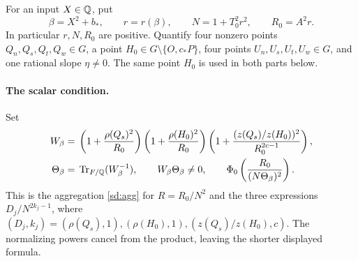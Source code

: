 For an input $X\in\mathbb Q$, put
\[
 \beta=X^2+b_*,\qquad r=r(\beta),\qquad N=1+T_0^2r^2,
 \qquad R_0=A^2r.
\]
In particular $r,N,R_0$ are positive. Quantify four nonzero points
$Q_n,Q_s,Q_t,Q_w\in G$, a point $H_0\in G\setminus\{O,c_*P\}$,
four points $U_n,U_s,U_t,U_w\in G$, and one rational slope $\eta\ne0$.
The same point $H_0$ is used in both parts below.

\paragraph{The scalar condition.}
Set
\begin{equation}\label{sd:scalar}
 \begin{split}
 W_\beta={}&\left(1+\frac{\rho(Q_s)^2}{R_0}\right)
             \left(1+\frac{\rho(H_0)^2}{R_0}\right)
             \left(1+\frac{(z(Q_s)/z(H_0))^2}{R_0^{2c-1}}\right),\\
 \Theta_\beta={}&\operatorname{Tr}_{F/\mathbb Q}(W_\beta^{-1}),\qquad
 W_\beta\Theta_\beta\ne0,\qquad
 \Phi_0\left(\frac{R_0}{(N\Theta_\beta)^2}\right).
 \end{split}
\end{equation}
This is the aggregation \eqref{sd:agg} for $R=R_0/N^2$ and the three
expressions $D_j/N^{2k_j-1}$, where
$(D_j,k_j)=(\rho(Q_s),1),(\rho(H_0),1),(z(Q_s)/z(H_0),c)$.
The normalizing powers cancel from the product, leaving the shorter
displayed formula.


